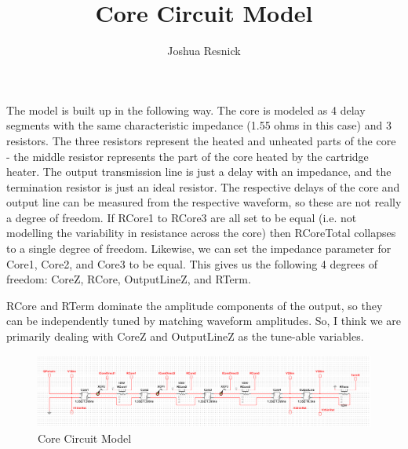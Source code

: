 \documentclass{article}
\title{Core Circuit Model }
\author{Joshua Resnick}
\begin{document}
\maketitle


The model is built up in the following way. The core is modeled as 4 delay segments with the same characteristic impedance (1.55 ohms in this case) and 3 resistors. The three resistors represent the heated and unheated parts of the core - the middle resistor represents the part of the core heated by the cartridge heater. The output transmission line is just a delay with an impedance, and the termination resistor is just an ideal resistor. The respective delays of the core and output line can be measured from the respective waveform, so these are not really a degree of freedom. If RCore1 to RCore3 are all set to be equal (i.e. not modelling the variability in resistance across the core) then RCoreTotal collapses to a single degree of freedom. Likewise, we can set the impedance parameter for Core1, Core2, and Core3 to be equal. This gives us the following 4 degrees of freedom:
CoreZ, RCore, OutputLineZ, and RTerm.

RCore and RTerm dominate the amplitude components of the output, so they can be independently tuned by matching waveform amplitudes. So, I think we are primarily dealing with CoreZ and OutputLineZ as the tune-able variables. 


\begin{figure}
[h]
\begin{center}
\includegraphics[scale=0.4]{image.png} 
\caption{Core Circuit Model}%
\end{center}
\end{figure}
\end{document}
